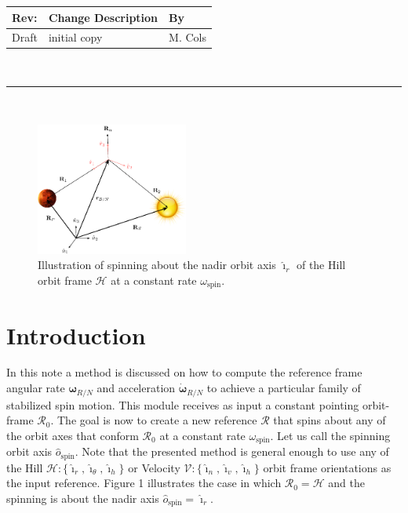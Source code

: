 \documentclass[]{AVSSimReportMemo}
\begin{document}
\makeCover


%
%
\pagestyle{empty}
{\renewcommand{\arraystretch}{2}
\noindent
\begin{longtable}{|p{0.5in}|p{4.5in}|p{1.14in}|}
\hline
{\bfseries Rev}: & {\bfseries Change Description} & {\bfseries By} \\
\hline
Draft & initial copy & M. Cols \\
\hline

\end{longtable}
}

\newpage
\setcounter{page}{1}
\pagestyle{fancy}

\tableofcontents
~\\ \hrule ~\\

\begin{figure}[htb]
	\centerline{
	\includegraphics[width=5cm]{Figures/Fig1}
	}
	\caption{Illustration of spinning about the nadir orbit axis $\bm\hat{\imath}_{r}$ of the Hill orbit frame $\mathcal{H}$  at a constant rate $\omega_{\textrm{spin}}$.}
	\label{fig:Fig1}
\end{figure}

\section{Introduction}
In this note a method is discussed on how to compute the reference frame angular rate $\bm\omega_{R/N}$ and acceleration $\dot{\bm\omega}_{R/N}$ to achieve a particular family of stabilized spin motion. This module receives as input a constant pointing orbit-frame $\mathcal{R}_{0}$. The goal is now to create a new reference $\mathcal{R}$ that spins about any of the orbit axes that conform $\mathcal{R}_{0}$  at a constant rate $\omega_{\textrm{spin}}$. Let us call the spinning orbit axis $\hat {o}_{\textrm{spin}}$. Note that the presented method is general enough to use any of the Hill $\mathcal{H}:\{ \hat{\bm\imath}_{r}, \hat{\bm\imath}_{\theta}, \hat{\bm\imath}_{h} \}$ or Velocity $\mathcal{V}:\{ \hat{\bm\imath}_{n}, \hat{\bm\imath}_{v}, \hat{\bm\imath}_{h} \}$ orbit frame orientations as the input reference. Figure 1 illustrates the case in which $\mathcal{R}_{0} = \mathcal{H}$ and the spinning is about the nadir axis $\hat {o}_{\textrm{spin}} = \hat{\bm\imath}_{r}$.
\end{document}
